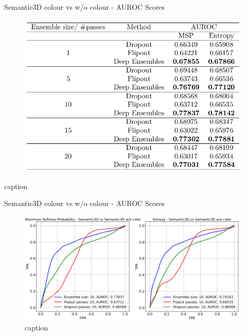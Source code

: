 \documentclass[aspectratio=169]{beamer}
\begin{document}
\begin{frame}{Semantic3D colour vs w/o colour - AUROC Scores}
    \begin{figure}
        \centering
        \includegraphics[scale=0.35]{images/ood2/AUROC_OOD2.jpg}
    \end{figure}
    \begin{table}
        \caption{caption}
    \end{table}
\end{frame}
\begin{frame}{Semantic3D colour vs w/o colour - AUROC Scores}
    \begin{figure}
        \centering
        \includegraphics[scale=0.35]{images/ood2_roc_curves.jpg}
        \caption{caption}
    \end{figure}
\end{frame}

\end{document}
